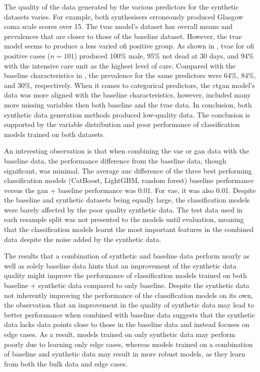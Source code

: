 \documentclass[12pt, a4paper]{article}
\begin{document}
The quality of the data generated by the various predictors for the synthetic datasets varies. For example, both
synthesisers erroneously produced Glasgow coma scale scores over 15. The \acrshort{tvae} model's dataset has overall
means and prevalences that are closer to those of the baseline dataset. However, the \acrshort{tvae} model seems to
produce a less varied \acrshort{ofi} positive group. As shown in , \acrshort{tvae} for
\acrshort{ofi} positive cases ($n=101$) produced 100\% male, 95\% not dead at 30 days, and 94\% with the intensive care
unit as the highest level of care. Compared with the baseline characteristics in , the prevalence
for the same predictors were 64\%, 84\%, and 30\%, respectively. When it comes to categorical predictors, the
\acrshort{ctgan} model's data was more aligned with the baseline characteristics, however, included many more missing
variables then both baseline and the \acrshort{tvae} data. In conclusion, both synthetic data generation methods
produced low-quality data. The conclusion is supported by the variable distribution and poor performance of
classification models trained on both datasets.

An interesting observation is that when combining the \acrshort{vae} or \acrshort{gan} data with the baseline data, the
performance difference from the baseline data, though significant, was minimal. The average \acrshort{auc} difference
of the three best performing classification models (CatBoost, LightGBM, random forest) baseline performance versus the
\acrshort{gan} + baseline performance was 0.01. For \acrshort{vae}, it was also 0.01. Despite the baseline and
synthetic datasets being equally large, the classification models were barely affected by the poor quality synthetic
data. The test data used in each resample split was not presented to the models until evaluation, meaning that the
classification models learnt the most important features in the combined data despite the noise added by the synthetic
data.

The results that a combination of synthetic and baseline data perform nearly as well as solely baseline data hints that
an improvement of the synthetic data quality might improve the performance of classification models trained on both
baseline + synthetic data compared to only baseline. Despite the synthetic data not inherently improving the
performance of the classification models on its own, the observation that an improvement in the quality of synthetic
data may lead to better performance when combined with baseline data suggests that the synthetic data lacks data points
close to those in the baseline data and instead focuses on edge cases. As a result, models trained on only synthetic
data may perform poorly due to learning only edge cases, whereas models trained on a combination of baseline and
synthetic data may result in more robust models, as they learn from both the bulk data and edge cases.
\end{document}
